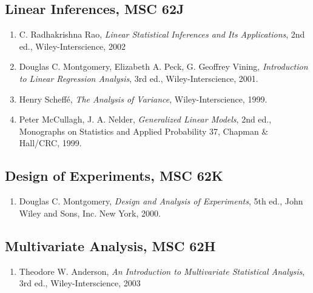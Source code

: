 \documentclass[12pt]{article}
\begin{document}
\subsection*{Linear Inferences, MSC 62J}
\begin{enumerate}
\item C. Radhakrishna Rao, \emph{Linear Statistical Inferences and Its Applications},
2nd ed., Wiley-Interscience, 2002
\item Douglas C. Montgomery, Elizabeth A. Peck, G. Geoffrey Vining,
\emph{Introduction to Linear Regression Analysis}, 3rd ed.,
Wiley-Interscience, 2001.
\item Henry Scheff\'{e}, \emph{The Analysis of Variance}, Wiley-Interscience, 1999.
\item Peter McCullagh, J. A. Nelder, \emph{Generalized Linear Models}, 2nd ed.,
Monographs on Statistics and Applied Probability 37, Chapman \&
Hall/CRC, 1999.
\end{enumerate}

\subsection*{Design of Experiments, MSC 62K}
\begin{enumerate}
\item Douglas C. Montgomery, \emph{Design and Analysis of Experiments},
5th ed., John Wiley and Sons, Inc. New York, 2000.
\end{enumerate}

\subsection*{Multivariate Analysis, MSC 62H}
\begin{enumerate}
\item Theodore W. Anderson, \emph{An Introduction to Multivariate
Statistical Analysis}, 3rd ed., Wiley-Interscience, 2003
\end{enumerate}
\end{document}
